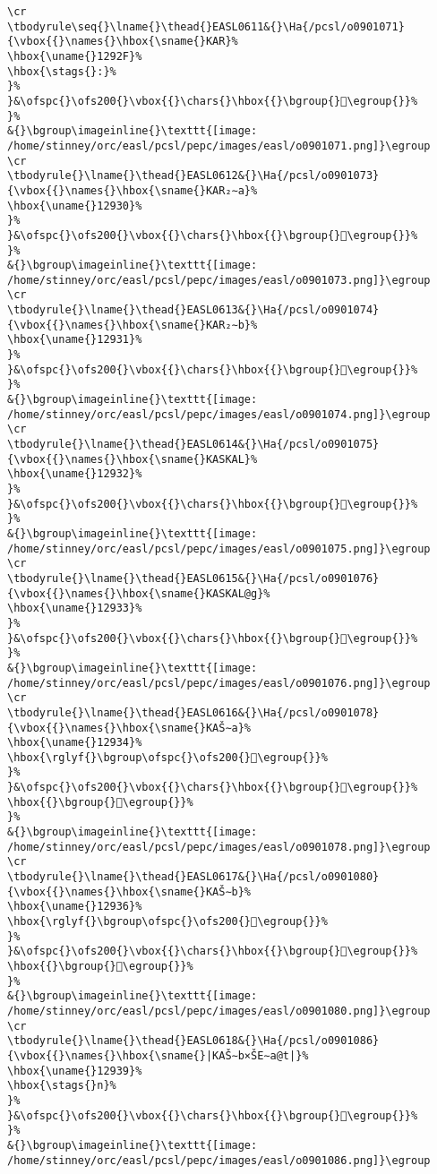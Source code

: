 \begin{verbatim}
\cr
\tbodyrule\seq{}\lname{}\thead{}EASL0611&{}\Ha{/pcsl/o0901071}{\vbox{{}\names{}\hbox{\sname{}KAR}%
\hbox{\uname{}1292F}%
\hbox{\stags{}:}%
}%
}&\ofspc{}\ofs200{}\vbox{{}\chars{}\hbox{{}\bgroup{}𒤯\egroup{}}%
}%
&{}\bgroup\imageinline{}\texttt{[image: /home/stinney/orc/easl/pcsl/pepc/images/easl/o0901071.png]}\egroup
\cr
\tbodyrule{}\lname{}\thead{}EASL0612&{}\Ha{/pcsl/o0901073}{\vbox{{}\names{}\hbox{\sname{}KAR₂∼a}%
\hbox{\uname{}12930}%
}%
}&\ofspc{}\ofs200{}\vbox{{}\chars{}\hbox{{}\bgroup{}𒤰\egroup{}}%
}%
&{}\bgroup\imageinline{}\texttt{[image: /home/stinney/orc/easl/pcsl/pepc/images/easl/o0901073.png]}\egroup
\cr
\tbodyrule{}\lname{}\thead{}EASL0613&{}\Ha{/pcsl/o0901074}{\vbox{{}\names{}\hbox{\sname{}KAR₂∼b}%
\hbox{\uname{}12931}%
}%
}&\ofspc{}\ofs200{}\vbox{{}\chars{}\hbox{{}\bgroup{}𒤱\egroup{}}%
}%
&{}\bgroup\imageinline{}\texttt{[image: /home/stinney/orc/easl/pcsl/pepc/images/easl/o0901074.png]}\egroup
\cr
\tbodyrule{}\lname{}\thead{}EASL0614&{}\Ha{/pcsl/o0901075}{\vbox{{}\names{}\hbox{\sname{}KASKAL}%
\hbox{\uname{}12932}%
}%
}&\ofspc{}\ofs200{}\vbox{{}\chars{}\hbox{{}\bgroup{}𒤲\egroup{}}%
}%
&{}\bgroup\imageinline{}\texttt{[image: /home/stinney/orc/easl/pcsl/pepc/images/easl/o0901075.png]}\egroup
\cr
\tbodyrule{}\lname{}\thead{}EASL0615&{}\Ha{/pcsl/o0901076}{\vbox{{}\names{}\hbox{\sname{}KASKAL@g}%
\hbox{\uname{}12933}%
}%
}&\ofspc{}\ofs200{}\vbox{{}\chars{}\hbox{{}\bgroup{}𒤳\egroup{}}%
}%
&{}\bgroup\imageinline{}\texttt{[image: /home/stinney/orc/easl/pcsl/pepc/images/easl/o0901076.png]}\egroup
\cr
\tbodyrule{}\lname{}\thead{}EASL0616&{}\Ha{/pcsl/o0901078}{\vbox{{}\names{}\hbox{\sname{}KAŠ∼a}%
\hbox{\uname{}12934}%
\hbox{\rglyf{}\bgroup\ofspc{}\ofs200{}𒤴\egroup{}}%
}%
}&\ofspc{}\ofs200{}\vbox{{}\chars{}\hbox{{}\bgroup{}𒤵\egroup{}}%
\hbox{{}\bgroup{}𒤴\egroup{}}%
}%
&{}\bgroup\imageinline{}\texttt{[image: /home/stinney/orc/easl/pcsl/pepc/images/easl/o0901078.png]}\egroup
\cr
\tbodyrule{}\lname{}\thead{}EASL0617&{}\Ha{/pcsl/o0901080}{\vbox{{}\names{}\hbox{\sname{}KAŠ∼b}%
\hbox{\uname{}12936}%
\hbox{\rglyf{}\bgroup\ofspc{}\ofs200{}𒤶\egroup{}}%
}%
}&\ofspc{}\ofs200{}\vbox{{}\chars{}\hbox{{}\bgroup{}𒤸\egroup{}}%
\hbox{{}\bgroup{}𒤶\egroup{}}%
}%
&{}\bgroup\imageinline{}\texttt{[image: /home/stinney/orc/easl/pcsl/pepc/images/easl/o0901080.png]}\egroup
\cr
\tbodyrule{}\lname{}\thead{}EASL0618&{}\Ha{/pcsl/o0901086}{\vbox{{}\names{}\hbox{\sname{}|KAŠ∼b×ŠE∼a@t|}%
\hbox{\uname{}12939}%
\hbox{\stags{}n}%
}%
}&\ofspc{}\ofs200{}\vbox{{}\chars{}\hbox{{}\bgroup{}𒤹\egroup{}}%
}%
&{}\bgroup\imageinline{}\texttt{[image: /home/stinney/orc/easl/pcsl/pepc/images/easl/o0901086.png]}\egroup

\end{verbatim}
